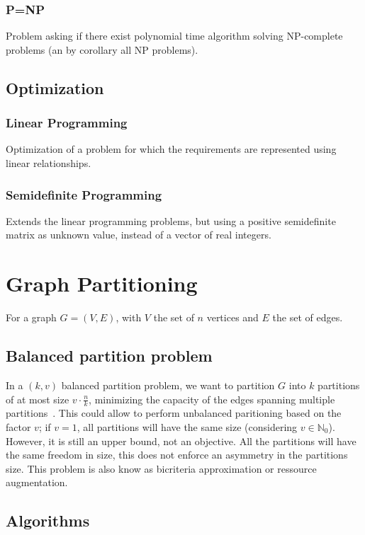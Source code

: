 \documentclass[12pt,a4paper]{article}
\theoremstyle{customdef}
\begin{document}
\subsubsection{P=NP}
Problem asking if there exist polynomial time algorithm solving NP-complete problems (an by corollary all NP problems).

\subsection{Optimization}

\subsubsection{Linear Programming}
Optimization of a problem for which the requirements are represented using linear relationships.

\subsubsection{Semidefinite Programming}
Extends the linear programming problems, but using a positive semidefinite matrix as unknown value, instead of a vector of real integers.

\section{Graph Partitioning}
For a graph $G = (V, E)$, with $V$ the set of $n$ vertices and $E$ the set of edges.

\subsection{Balanced partition problem}
In a $(k, v)$ balanced partition problem, we want to partition $G$ into $k$ partitions of at most size $v\cdot\frac{n}{k}$, minimizing the capacity of the edges spanning multiple partitions~\cite{Andreev:2004:BGP:1007912.1007931}.
This could allow to perform unbalanced paritioning based on the factor $v$; if $v = 1$, all partitions will have the same size (considering $v \in \mathbb{N}_0$).
However, it is still an upper bound, not an objective.
All the partitions will have the same freedom in size, this does not enforce an asymmetry in the partitions size.
This problem is also know as bicriteria approximation or ressource augmentation.

\subsection{Algorithms}
\cite{SungKyuLim:ECE6133:partitioning}
\end{document}
